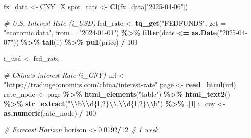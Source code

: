 \documentclass[
]{article}
\newenvironment{Shaded}{\begin{snugshade}}{\end{snugshade}}
\newcommand{\AttributeTok}[1]{\textcolor[rgb]{0.13,0.29,0.53}{#1}}
\newcommand{\CommentTok}[1]{\textcolor[rgb]{0.56,0.35,0.01}{\textit{#1}}}
\newcommand{\DecValTok}[1]{\textcolor[rgb]{0.00,0.00,0.81}{#1}}
\newcommand{\FloatTok}[1]{\textcolor[rgb]{0.00,0.00,0.81}{#1}}
\newcommand{\FunctionTok}[1]{\textcolor[rgb]{0.13,0.29,0.53}{\textbf{#1}}}
\newcommand{\NormalTok}[1]{#1}
\newcommand{\OtherTok}[1]{\textcolor[rgb]{0.56,0.35,0.01}{#1}}
\newcommand{\SpecialCharTok}[1]{\textcolor[rgb]{0.81,0.36,0.00}{\textbf{#1}}}
\newcommand{\StringTok}[1]{\textcolor[rgb]{0.31,0.60,0.02}{#1}}
\begin{document}
\begin{Shaded}
\begin{Highlighting}[]
\NormalTok{fx\_data }\OtherTok{\textless{}{-}} \StringTok{\textasciigrave{}}\AttributeTok{CNY=X}\StringTok{\textasciigrave{}}
\NormalTok{spot\_rate }\OtherTok{\textless{}{-}} \FunctionTok{Cl}\NormalTok{(fx\_data[}\StringTok{"2025{-}04{-}06"}\NormalTok{])}

\CommentTok{\# U.S. Interest Rate (i\_USD)}
\NormalTok{fed\_rate }\OtherTok{\textless{}{-}} \FunctionTok{tq\_get}\NormalTok{(}\StringTok{"FEDFUNDS"}\NormalTok{, }\AttributeTok{get =} \StringTok{"economic.data"}\NormalTok{, }\AttributeTok{from =} \StringTok{"2024{-}01{-}01"}\NormalTok{) }\SpecialCharTok{\%\textgreater{}\%}
  \FunctionTok{filter}\NormalTok{(date }\SpecialCharTok{\textless{}=} \FunctionTok{as.Date}\NormalTok{(}\StringTok{"2025{-}04{-}07"}\NormalTok{)) }\SpecialCharTok{\%\textgreater{}\%}
  \FunctionTok{tail}\NormalTok{(}\DecValTok{1}\NormalTok{) }\SpecialCharTok{\%\textgreater{}\%}
  \FunctionTok{pull}\NormalTok{(price) }\SpecialCharTok{/} \DecValTok{100}  

\NormalTok{i\_usd }\OtherTok{\textless{}{-}}\NormalTok{ fed\_rate}

\CommentTok{\# China’s Interest Rate (i\_CNY)}
\NormalTok{url }\OtherTok{\textless{}{-}} \StringTok{"https://tradingeconomics.com/china/interest{-}rate"}
\NormalTok{page }\OtherTok{\textless{}{-}} \FunctionTok{read\_html}\NormalTok{(url)}
\NormalTok{rate\_node }\OtherTok{\textless{}{-}}\NormalTok{ page }\SpecialCharTok{\%\textgreater{}\%}
  \FunctionTok{html\_elements}\NormalTok{(}\StringTok{"table"}\NormalTok{) }\SpecialCharTok{\%\textgreater{}\%}
  \FunctionTok{html\_text2}\NormalTok{() }\SpecialCharTok{\%\textgreater{}\%}
  \FunctionTok{str\_extract}\NormalTok{(}\StringTok{"}\SpecialCharTok{\textbackslash{}\textbackslash{}}\StringTok{b}\SpecialCharTok{\textbackslash{}\textbackslash{}}\StringTok{d\{1,2\}}\SpecialCharTok{\textbackslash{}\textbackslash{}}\StringTok{.}\SpecialCharTok{\textbackslash{}\textbackslash{}}\StringTok{d\{1,2\}}\SpecialCharTok{\textbackslash{}\textbackslash{}}\StringTok{b"}\NormalTok{) }\SpecialCharTok{\%\textgreater{}\%}
\NormalTok{  .[}\DecValTok{1}\NormalTok{]}
\NormalTok{i\_cny }\OtherTok{\textless{}{-}} \FunctionTok{as.numeric}\NormalTok{(rate\_node) }\SpecialCharTok{/} \DecValTok{100}

\CommentTok{\# Forecast Horizon}
\NormalTok{horizon }\OtherTok{\textless{}{-}} \FloatTok{0.0192}\SpecialCharTok{/}\DecValTok{12}  \CommentTok{\# 1 week}



\end{Highlighting}
\end{Shaded}
\end{document}
